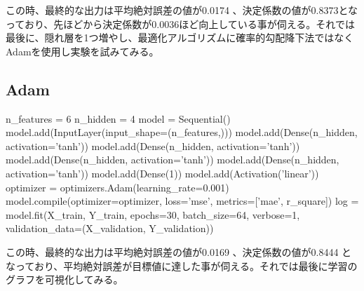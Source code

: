 \documentclass{article}
\begin{document}
この時、最終的な出力は平均絶対誤差の値が0.0174 、決定係数の値が0.8373となっており、先ほどから決定係数が0.0036ほど向上している事が伺える。それでは最後に、隠れ層を1つ増やし、最適化アルゴリズムに確率的勾配降下法ではなくAdamを使用し実験を試みてみる。

\subsection{Adam}




\begin{python}
n_features = 6
n_hidden   = 4
model = Sequential()
model.add(InputLayer(input_shape=(n_features,)))
model.add(Dense(n_hidden, activation='tanh'))
model.add(Dense(n_hidden, activation='tanh'))
model.add(Dense(n_hidden, activation='tanh'))
model.add(Dense(n_hidden, activation='tanh'))
model.add(Dense(1))
model.add(Activation('linear'))
optimizer = optimizers.Adam(learning_rate=0.001)
model.compile(optimizer=optimizer,
              loss='mse', metrics=['mae', r_square])
log = model.fit(X_train, Y_train, epochs=30, batch_size=64, 
verbose=1,
         validation_data=(X_validation, Y_validation))
\end{python}

この時、最終的な出力は平均絶対誤差の値が0.0169 、決定係数の値が0.8444 となっており、平均絶対誤差が目標値に達した事が伺える。それでは最後に学習のグラフを可視化してみる。
\\
\end{document}
